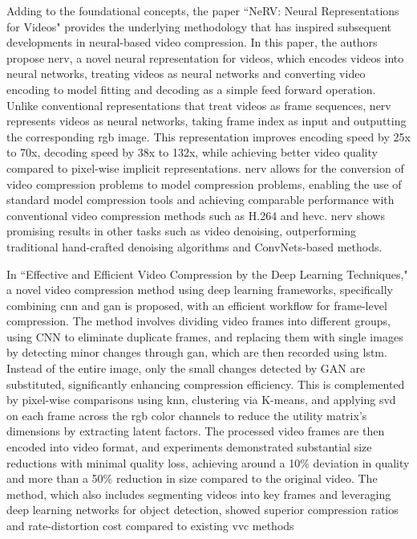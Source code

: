 \documentclass{ioereport}
\begin{document}
Adding to the foundational concepts, the paper ``NeRV: Neural Representations for Videos" \cite{chen2021nerv} provides the underlying methodology that has inspired subsequent developments in neural-based video compression. In this paper, the authors propose \gls{nerv}, a novel neural representation for videos, which encodes videos into neural networks, treating videos as neural networks and converting video encoding to model fitting and decoding as a simple feed forward operation. Unlike conventional representations that treat videos as frame sequences, \gls{nerv} represents videos as neural networks, taking frame index as input and outputting the corresponding \gls{rgb} image. This representation improves encoding speed by 25x to 70x, decoding speed by 38x to 132x, while achieving better video quality compared to pixel-wise implicit representations. \gls{nerv} allows for the conversion of video compression problems to model compression problems, enabling the use of standard model compression tools and achieving comparable performance with conventional video compression methods such as H.264 and \gls{hevc}. \gls{nerv} shows promising results in other tasks such as video denoising, outperforming traditional hand-crafted denoising algorithms and ConvNets-based methods.

In ``Effective and Efficient Video Compression by the Deep Learning Techniques," \cite{paneerselvam_effective} a novel video compression method using deep learning frameworks, specifically combining \gls{cnn} and \gls{gan} is proposed, with an efficient workflow for frame-level compression. The method involves dividing video frames into different groups, using CNN to eliminate duplicate frames, and replacing them with single images by detecting minor changes through \gls{gan}, which are then recorded using \gls{lstm}. Instead of the entire image, only the small changes detected by GAN are substituted, significantly enhancing compression efficiency. This is complemented by pixel-wise comparisons using \gls{knn}, clustering via K-means, and applying \gls{svd} on each frame across the \gls{rgb} color channels to reduce the utility matrix's dimensions by extracting latent factors. The processed video frames are then encoded into video format, and experiments demonstrated substantial size reductions with minimal quality loss, achieving around a 10\% deviation in quality and more than a 50\% reduction in size compared to the original video. The method, which also includes segmenting videos into key frames and leveraging deep learning networks for object detection, showed superior compression ratios and rate-distortion cost compared to existing \gls{vvc} methods
\end{document}
